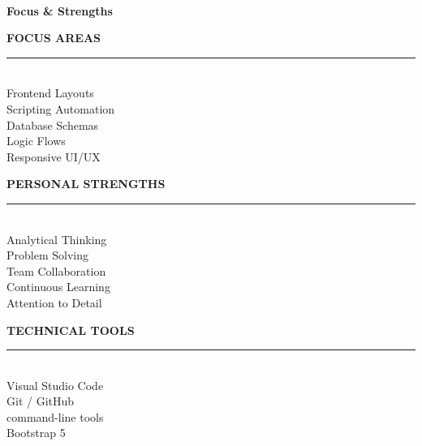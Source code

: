 \documentclass[10pt,a4paper]{article}
\newlength{\SW}\setlength{\SW}{6.3cm}    %
\newlength{\MW}\setlength{\MW}{14.7cm}   %
\newlength{\PH}\setlength{\PH}{29.7cm}   %
\newcommand{\sHead}[1]{%
  \vspace{10pt}%
  {\color{RoseGold}\bfseries\scriptsize\MakeUppercase{#1}}%
  \\[-3pt]{\color{RoseGoldLight}\rule{\linewidth}{1.2pt}}\\[5pt]}
\begin{document}
\begin{minipage}[t]{\SW}

  \vspace*{20pt}
  \begin{center}
    \vspace{10pt}
    \\[2pt]
    {\color{RoseGoldLight}\scriptsize\bfseries Focus \& Strengths}
  \end{center}
  \vspace{10pt}
  \hspace*{12pt}%
  \begin{minipage}[t]{\SW-22pt}

    \sHead{Focus Areas}
    {\color{white}\footnotesize
      \textbullet\enspace Frontend Layouts\\[3pt]
      \textbullet\enspace Scripting Automation\\[3pt]
      \textbullet\enspace Database Schemas\\[3pt]
      \textbullet\enspace Logic Flows\\[3pt]
      \textbullet\enspace Responsive UI/UX
    }
    
    \sHead{Personal Strengths}
    {\color{white}\footnotesize
      \textbullet\enspace Analytical Thinking\\[3pt]
      \textbullet\enspace Problem Solving\\[3pt]
      \textbullet\enspace Team Collaboration\\[3pt]
      \textbullet\enspace Continuous Learning\\[3pt]
      \textbullet\enspace Attention to Detail
    }
    
    \sHead{Technical Tools}
    {\color{white}\footnotesize
      \textbullet\enspace Visual Studio Code\\[3pt]
      \textbullet\enspace Git / GitHub\\[3pt]
      \textbullet\enspace command-line tools\\[3pt]
      \textbullet\enspace Bootstrap 5
    }
  \end{minipage}
\end{minipage}%
\end{document}
